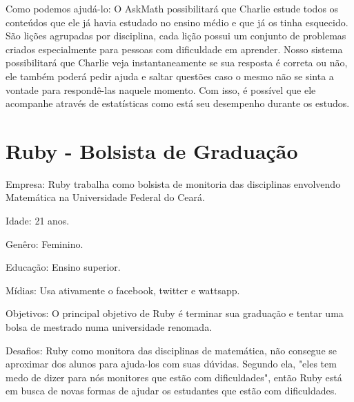 Como podemos ajudá-lo: O AskMath possibilitará que Charlie estude 
todos os conteúdos que ele j\'a havia estudado no ensino médio e que já os tinha esquecido. São lições agrupadas por disciplina, cada lição possui um conjunto de problemas criados especialmente para 
pessoas com dificuldade em aprender. Nosso sistema possibilitará que Charlie veja instantaneamente se sua resposta é correta ou não, ele também poderá pedir ajuda 
e saltar quest\~oes caso o mesmo não se sinta a vontade para respondê-las naquele 
momento. Com isso, é possível que ele acompanhe através de estatísticas como 
está seu desempenho durante os estudos.

\section{Ruby - Bolsista de Graduação}

\begin{figure}[h!]
  \centering
\end{figure}


Empresa: Ruby trabalha como bolsista de monitoria das disciplinas envolvendo 
Matemática na Universidade Federal do Ceará.

Idade: 21 anos.

Genêro: Feminino.

Educação: Ensino superior.

Mídias: Usa ativamente o facebook, twitter e wattsapp.

Objetivos: O principal objetivo de Ruby é terminar sua graduação e tentar uma 
bolsa de mestrado numa universidade renomada.

Desafios: Ruby como monitora das disciplinas de matemática, não consegue se
aproximar dos alunos para ajuda-los com suas dúvidas. Segundo ela, "eles tem medo de 
dizer para nós monitores que est\~ao com dificuldades", então Ruby está em busca de 
novas formas de ajudar os estudantes que estão com dificuldades.

